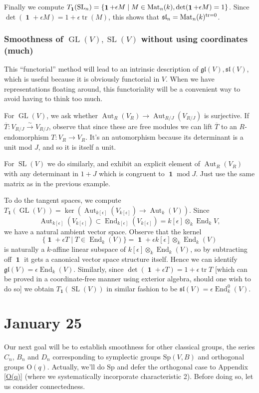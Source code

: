 \documentclass[10pt]{article}
\renewcommand{\O}{\mathscr{O}}
\newcommand{\GL}{\operatorname{GL}}
\newcommand{\SL}{\operatorname{SL}}
\newcommand{\tr}{\operatorname{tr}}
\renewcommand{\(}{\left(}
\renewcommand{\)}{\right)}
\renewcommand{\bar}{\overline}
\newcommand{\End}{\operatorname{End}}
\DeclareMathOperator{\Aut}{Aut}
\DeclareMathOperator{\id}{\mathbf{1}}
\renewcommand{\mod}{\operatorname{mod}}
\newcommand{\dotimes}{\displaystyle\mathop{\otimes}}
\newcommand{\gl}{\mathfrak{gl}}
\renewcommand{\sl}{\mathfrak{sl}}
\renewcommand{\O}{\mathrm{O}}
\newcommand{\Sp}{\mathrm{Sp}}
\numberwithin{thm}{subsection}
\begin{document}
Finally we compute $T_{\id}(\SL_n)=\{\id+\epsilon M\mid M\in {\rm{Mat}}_n(k),\det(\id+\epsilon M)=1\}$.
Since $\det(\id+\epsilon M)=1+\epsilon \tr(M)$,
this shows that $\sl_n={\rm{Mat}}_n(k)^{\tr=0}$.
\subsubsection{Smoothness of $\GL(V),\SL(V)$ without using coordinates (much)}
This ``functorial'' method will lead to an intrinsic description
of $\gl(V),\sl(V)$, which is useful because it is obviously functorial in $V$.
When we have representations floating around, this functoriality will
be a convenient way to avoid having to think too much.

For $\GL(V)$, we ask whether $\Aut_R(V_R)\to \Aut_{R/J}(V_{R/J})$ is surjective.
If $\bar T:V_{R/J}\stackrel{\sim}{\to}V_{R/J}$,
observe that since these are free modules
we can lift $\bar T$ to an $R$-endomorphism $T:V_R\to V_R$.
It's an automorphism because its determinant is a unit mod $J$,
and so it is itself a unit.

For $\SL(V)$ we do similarly, and exhibit an explicit element
of $\Aut_R(V_R)$ with any determinant in $1+J$ which is congruent to $\id\mod J$. Just use the same matrix as in the previous example.

To do the tangent spaces,
we compute $T_{\id}(\GL(V))=\ker(\Aut_{k[\epsilon]}(V_{k[\epsilon]})\to \Aut_k(V))$.
Since $$\Aut_{k[\epsilon]}(V_{k[\epsilon]})\subset\End_{k[\epsilon]}(V_{k[\epsilon]})
=k[\epsilon]\dotimes_k\End_kV,$$ we have a natural ambient vector space.
Observe that the kernel
$$\{\id +\epsilon T\mid T\in \End_k(V)\}
=\id+\epsilon k[\epsilon]\dotimes_k\End_k(V)$$ is naturally a $k$-affine linear
subspace of $k[\epsilon]\dotimes_k\End_k(V)$, so
by subtracting off $\id$ it gets a canonical vector space structure itself. 
Hence we can identify $\gl(V)=\epsilon\End_k(V)$.
Similarly, since $\det(\id+\epsilon T)=1+\epsilon \tr T$
[which can be proved in a coordinate-free manner
using exterior algebra, should one wish to do so]
we obtain $T_{\id}(\SL(V))$ in similar fashion
to be $\sl(V)=\epsilon \End_k^0(V)$.
 

\section{January 25}
Our next goal will be to establish smoothness for other classical groups,
the series $C_n$, $B_n$ and $D_n$ corresponding to symplectic groups
$\Sp(V,B)$ and orthogonal groups $\O(q)$. Actually, we'll do $\Sp$ and defer
the orthogonal case to Appendix \ref{O(q)} (where we systematically incorporate
characteristic 2). Before doing so, let us consider connectedness.
\end{document}

